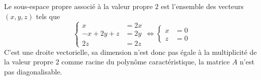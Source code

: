 {\begin{enumerate}
{Le sous-espace propre associé à la valeur propre $2$ est l'ensemble des vecteurs $(x,y,z)$ tels que 
$$\left\{\begin{aligned}x&=2x \\  -x+2y+z&=2y \\  2z&=2z\end{aligned}\right.\iff\left\{\begin{aligned}x&=0 \\   z&=0\end{aligned}\right.$$
C'est une droite vectorielle, sa dimension n'est donc pas égale à la multiplicité de la valeur propre $2$ comme racine du polynôme caractéristique, la matrice $A$ n'est pas diagonalisable.}
\end{enumerate}
}
